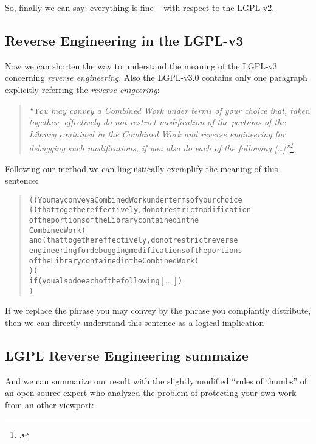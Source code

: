So, finally we can say: everything is fine -- with respect to the LGPL-v2. 

\subsection{Reverse Engineering in the LGPL-v3}

Now we can shorten the way to understand the meaning of the LGPL-v3 concerning
\emph{reverse engineering}. Also the LGPL-v3.0 contains only one paragraph
explicitly referring the \emph{reverse enigeering}: 

\begin{quote}\emph{
\enquote{You may convey a Combined Work under terms of your choice that,
taken together, effectively do not restrict modification of the portions
of the Library contained in the Combined Work and reverse engineering for
debugging such modifications, if you also do each of the following
[\ldots]}\footcite[cf.][\nopage wp]{Lgpl30OsiLicense2007a}}
\end{quote}

Following our method we can linguistically exemplify the meaning
of this sentence:

\begin{quote}
\begin{alltt}   
( ( You may convey a Combined Work under terms of your choice
    (   (that together effectively, do not restrict modification
		      of the portions of the Library contained in the 
		      Combined Work)
 	and (that together effectively, do not restrict reverse 
 	          engineering for debugging modifications of the portions
 	          of the Library contained in the Combined Work)
  )  )
  if ( you also do each of the following \([\ldots]\))
)
\end{alltt}
\end{quote}

If we replace the phrase you may convey by the phrase you compiantly distribute,
then we can directly understand this sentence as a logical implication

\subsection{LGPL Reverse Engineering summaize}

And we can summarize our result
with the slightly modified \enquote{rules of thumbs} of an open source expert
who analyzed the problem of protecting your own work from an other viewport:

